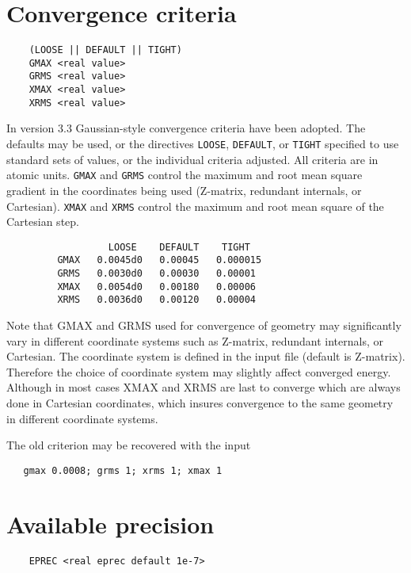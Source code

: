 \section{Convergence criteria}

\begin{verbatim}
    (LOOSE || DEFAULT || TIGHT)
    GMAX <real value>
    GRMS <real value>
    XMAX <real value>
    XRMS <real value>
\end{verbatim}

 In version 3.3 Gaussian-style convergence criteria have been adopted.
The defaults may be used, or the directives \verb+LOOSE+,
\verb+DEFAULT+, or \verb+TIGHT+ specified to use standard sets of
values, or the individual criteria adjusted.  All criteria are in
atomic units.
\verb+GMAX+ and \verb+GRMS+ control the maximum and root mean square
gradient in the coordinates being used (Z-matrix, redundant internals,
or Cartesian).  \verb+XMAX+ and \verb+XRMS+ control the maximum and
root mean square of the Cartesian step.

\begin{verbatim}
                  LOOSE    DEFAULT    TIGHT
         GMAX   0.0045d0   0.00045   0.000015   
         GRMS   0.0030d0   0.00030   0.00001
         XMAX   0.0054d0   0.00180   0.00006
         XRMS   0.0036d0   0.00120   0.00004
\end{verbatim}

 Note that GMAX and GRMS used for convergence of geometry may significantly vary in 
different coordinate systems such as Z-matrix, redundant internals, or Cartesian. 
The coordinate system is defined in the input file (default is Z-matrix). 
Therefore the choice of coordinate system may slightly affect converged energy. 
Although in most cases XMAX and XRMS are last to converge which are always done 
in Cartesian coordinates, which insures convergence to the same geometry in 
different coordinate systems.


The old criterion may be recovered with the input
\begin{verbatim}
   gmax 0.0008; grms 1; xrms 1; xmax 1
\end{verbatim}

\section{Available precision}

\begin{verbatim}
    EPREC <real eprec default 1e-7>
\end{verbatim}

